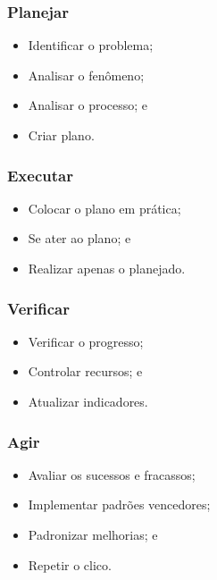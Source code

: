 \documentclass[aspectratio=169]{beamer}
\begin{document}
\begin{frame}
	\frametitle{Planejar}
	
	\begin{itemize}
		\item Identificar o problema;
		\item Analisar o fenômeno;
		\item Analisar o processo; e
		\item Criar plano.
	\end{itemize}
\end{frame}

\begin{frame}
	\frametitle{Executar}

	\begin{itemize}
		\item Colocar o plano em prática;
		\item Se ater ao plano; e
		\item Realizar apenas o planejado.
	\end{itemize}	
\end{frame}

\begin{frame}
	\frametitle{Verificar}

	\begin{itemize}
		\item Verificar o progresso;
		\item Controlar recursos; e
		\item Atualizar indicadores.
	\end{itemize}		
\end{frame}

\begin{frame}
	\frametitle{Agir}
	\begin{itemize}
		\item Avaliar os sucessos e fracassos;
		\item Implementar padrões vencedores;
		\item Padronizar melhorias; e
		\item Repetir o clico.
	\end{itemize}			
\end{frame}
\end{document}
